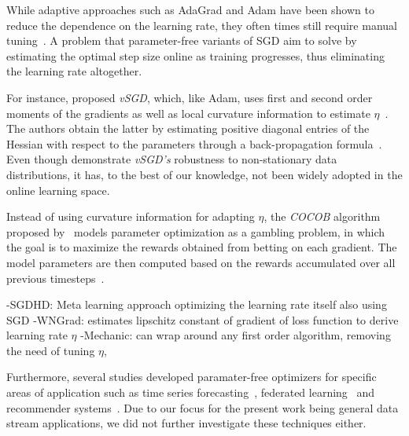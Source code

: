 \documentclass[letterpaper]{article} %
\begin{document}
While adaptive approaches such as AdaGrad and Adam have been shown to reduce the dependence on the learning rate, they often times still require manual tuning~\cite{wuWNGradLearnLearning2020}.
A problem that parameter-free variants of SGD aim to solve by estimating the optimal step size online as training progresses, thus eliminating the learning rate altogether.

For instance, \citet{schaulNoMorePesky2013} proposed \textit{vSGD}, which, like Adam, uses first and second order moments of the gradients as well as local curvature information to estimate $\eta$~\cite{schaulNoMorePesky2013}.
The authors obtain the latter by estimating positive diagonal entries of the Hessian with respect to the parameters through a back-propagation formula~\cite{schaulNoMorePesky2013}.
Even though \citet{schaulNoMorePesky2013} demonstrate \textit{vSGD's} robustness to non-stationary data distributions, it has, to the best of our knowledge, not been widely adopted in the online learning space. 

Instead of using curvature information for adapting $\eta$, the \textit{COCOB} algorithm proposed by~\citet{orabonaTrainingDeepNetworks2017} models parameter optimization as a gambling problem, in which the goal is to maximize the rewards obtained from betting on each gradient.
The model parameters are then computed based on the rewards accumulated over all previous timesteps~\cite{orabonaTrainingDeepNetworks2017}.

-SGDHD: Meta learning approach optimizing the learning rate itself also using SGD 
-WNGrad: estimates lipschitz constant of gradient of loss function to derive learning rate $\eta$
-Mechanic: can wrap around any first order algorithm, removing the need of tuning $\eta$, %


Furthermore, several studies developed paramater-free optimizers for specific areas of application such as time series forecasting~\cite{miyaguchiCograConceptDriftAwareStochastic2019,fekriDeepLearningLoad2021, zhangPOLAOnlineTime2021a}, federated learning~\cite{canonacoAdaptiveFederatedLearning2021} and recommender systems~\cite{ferreirajoseADADRIFTAdaptiveLearning2020}.
Due to our focus for the present work being general data stream applications, we did not further investigate these techniques either.
\end{document}
